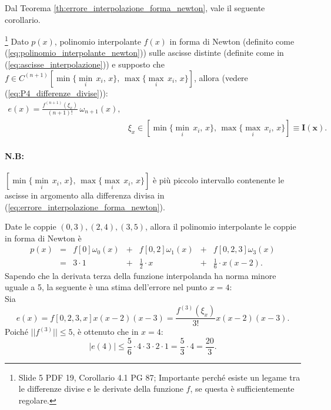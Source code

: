 
Dal Teorema \ref{th:errore_interpolazione_forma_newton}, vale il seguente corollario.

\begin{corollary}
    \footnote{Slide 5 PDF 19, Corollario 4.1 PG 87; Importante perché esiste un legame tra le differenze divise e le derivate della funzione $f$, se questa è sufficientemente regolare.}
    Dato $p(x)$, polinomio interpolante $f(x)$ in forma di Newton (definito come (\ref{eq:polinomio_interpolante_newton})) sulle ascisse distinte (definite come in (\ref{eq:ascisse_interpolazione})) e supposto che $f\in C^{(n+1)}[\min\{\underset{i}{\min}\,x_i,\,x\},\, \max\{\underset{i}{\max}\,x_i,\, x\}]$, allora (vedere (\ref{eq:P4_differenze_divise})):
    \begin{equation}\label{eq:errore_interpolazione_P4}
        \begin{matrix}
            e(x)=\frac{f^{(n+1)}(\xi_x)}{(n+1)!}\,\omega_{n+1}(x),&\\
            &\xi_x\in[\min\{\underset{i}{\min}\,x_i,\,x\},\, \max\{\underset{i}{\max}\,x_i,\, x\}]\boldsymbol{\equiv I(x)}.
        \end{matrix}
    \end{equation}
\end{corollary}

\paragraph{N.B:} $[\min\{\underset{i}{\min}\,x_i,\,x\},\, \max\{\underset{i}{\max}\,x_i,\, x\}]$ è più piccolo intervallo contenente le ascisse in argomento alla differenza divisa in (\ref{eq:errore_interpolazione_forma_newton}).

\begin{example}
	Date le coppie $(0,3), (2,4), (3,5)$, allora il polinomio interpolante le coppie in forma di Newton è
	\begin{equation*}
		\begin{matrix}
			p(x) & = & f[0]\omega_0(x) &+& f[0,2] \omega_1(x) &+& f[0,2,3] \omega_3(x)\\
					& = & 3 \cdot 1 &+& \frac{1}{2} \cdot x &+& \frac{1}{6} \cdot x(x-2).
		\end{matrix}
	\end{equation*}
	Sapendo che la derivata terza della funzione interpolanda ha norma minore uguale a 5, la seguente è una stima dell'errore nel punto $x=4$:\\
	Sia
	\begin{equation*}
		e(x) = f[0, 2, 3, x] x (x - 2) (x - 3) = \frac{f^{(3)}(\xi_x)}{3!} x (x - 2) (x - 3).
	\end{equation*}
	Poiché $||f^{(3)}|| \leq 5$, è ottenuto che in $x=4$:
	\begin{equation*}
		|e(4)| \leq \frac{5}{6} \cdot 4 \cdot 3 \cdot 2 \cdot 1 = \frac{5}{3} \cdot 4 = \frac{20}{3}.
	\end{equation*}
\end{example}

